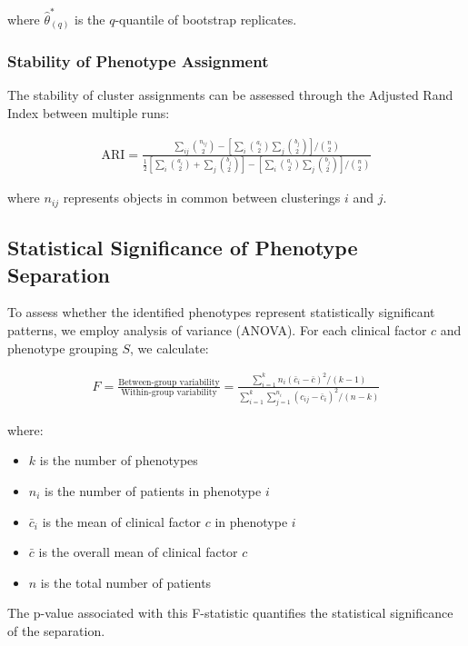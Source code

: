 \documentclass[12pt]{article}
\begin{document}
where $\hat{\theta}^*_{(q)}$ is the $q$-quantile of bootstrap replicates.

\subsubsection{Stability of Phenotype Assignment}

The stability of cluster assignments can be assessed through the Adjusted Rand Index between multiple runs:

\begin{align}
\text{ARI} = \frac{\sum_{ij} \binom{n_{ij}}{2} - [\sum_i \binom{a_i}{2} \sum_j \binom{b_j}{2}]/\binom{n}{2}}{\frac{1}{2}[\sum_i \binom{a_i}{2} + \sum_j \binom{b_j}{2}] - [\sum_i \binom{a_i}{2} \sum_j \binom{b_j}{2}]/\binom{n}{2}}
\end{align}

where $n_{ij}$ represents objects in common between clusterings $i$ and $j$.

\subsection{Statistical Significance of Phenotype Separation}

To assess whether the identified phenotypes represent statistically significant patterns, we employ analysis of variance (ANOVA). For each clinical factor $c$ and phenotype grouping $S$, we calculate:

\begin{align}
F = \frac{\text{Between-group variability}}{\text{Within-group variability}} = \frac{\sum_{i=1}^{k} n_i(\bar{c}_i - \bar{c})^2 / (k-1)}{\sum_{i=1}^{k}\sum_{j=1}^{n_i} (c_{ij} - \bar{c}_i)^2 / (n-k)}
\end{align}

where:
\begin{itemize}
    \item $k$ is the number of phenotypes
    \item $n_i$ is the number of patients in phenotype $i$
    \item $\bar{c}_i$ is the mean of clinical factor $c$ in phenotype $i$
    \item $\bar{c}$ is the overall mean of clinical factor $c$
    \item $n$ is the total number of patients
\end{itemize}

The p-value associated with this F-statistic quantifies the statistical significance of the separation.
\end{document}
